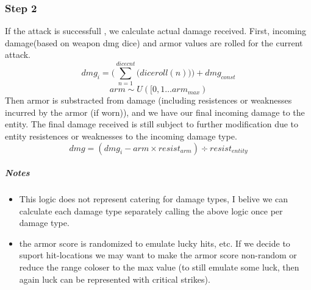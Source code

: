 \documentclass[a4paper,10pt]{book}
\begin{document}
\subsubsection*{Step 2}
If the attack is successfull , we calculate actual damage received. First,
incoming damage(based on weapon dmg dice) and armor values are rolled for the
current attack.
\begin{equation*}
  dmg_i =
  \Big(
    \sum\limits_{n=1}^{dicecnt}\big(diceroll(n)\big)
  \Big) + dmg_{const}
\end{equation*}
\begin{equation*} arm \sim U([0,1 \dots arm_{max}) \end{equation*}
Then armor is substracted from damage (including resistences or weaknesses
incurred by the armor (if worn)), and we have our final incoming damage to the
entity.  The final damage received is still subject to further modification due
to entity resistences or weaknesses to the incoming damage type.
\begin{equation*}
  dmg = (dmg_i - arm \times resist_{arm}) \div resist_{entity}
\end{equation*}

\subparagraph*{Notes}
\begin{itemize}
  \item This logic does not represent catering for damage types, I belive we can
    calculate each damage type separately calling the above logic once per
    damage type.
  \item the armor score is randomized to emulate lucky hits, etc. If we decide
    to suport hit-locations we may want to make the armor score non-random or
    reduce the range coloser to the max value (to still emulate some luck, then
    again luck can be represented with critical strikes).
\end{itemize}
\end{document}
